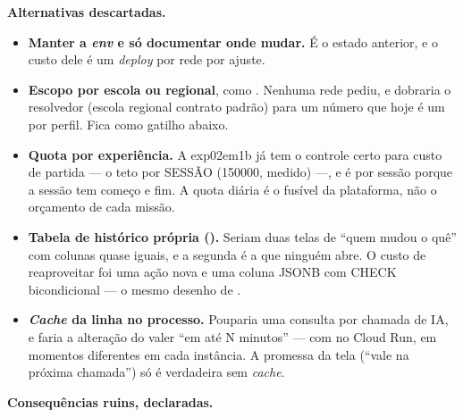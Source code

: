 \textbf{Alternativas descartadas.}

\begin{itemize}
  \item \textbf{Manter a \emph{env} e só documentar onde mudar.} É o estado
    anterior, e o custo dele é um \emph{deploy} por rede por ajuste.
  \item \textbf{Escopo por escola ou regional}, como .
    Nenhuma rede pediu, e dobraria o resolvedor (escola \seta{} regional
    \seta{} contrato \seta{} padrão) para um número que hoje é um por perfil.
    Fica como gatilho abaixo.
  \item \textbf{Quota por experiência.} A exp02em1b já tem o controle certo para
    custo de partida --- o teto por SESSÃO (\num{150000}, medido) ---, e é por
    sessão porque a sessão tem começo e fim. A quota diária é o fusível da
    plataforma, não o orçamento de cada missão.
  \item \textbf{Tabela de histórico própria ().}
    Seriam duas telas de \enquote{quem mudou o quê} com colunas quase iguais, e
    a segunda é a que ninguém abre. O custo de reaproveitar
     foi uma ação nova e uma coluna  JSONB
    com CHECK bicondicional --- o mesmo desenho de .
  \item \textbf{\emph{Cache} da linha no processo.} Pouparia uma consulta por
    chamada de IA, e faria a alteração do  valer \enquote{em até N
    minutos} --- com  no Cloud Run, em momentos diferentes
    em cada instância. A promessa da tela (\enquote{vale na próxima chamada})
    só é verdadeira sem \emph{cache}.
\end{itemize}

\textbf{Consequências ruins, declaradas.}

